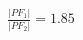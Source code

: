 \documentclass[preview]{standalone}
\begin{document}
\begin{align*}
\frac{|PF_1|}{|PF_2|} = 1.85
\end{align*}
\end{document}
